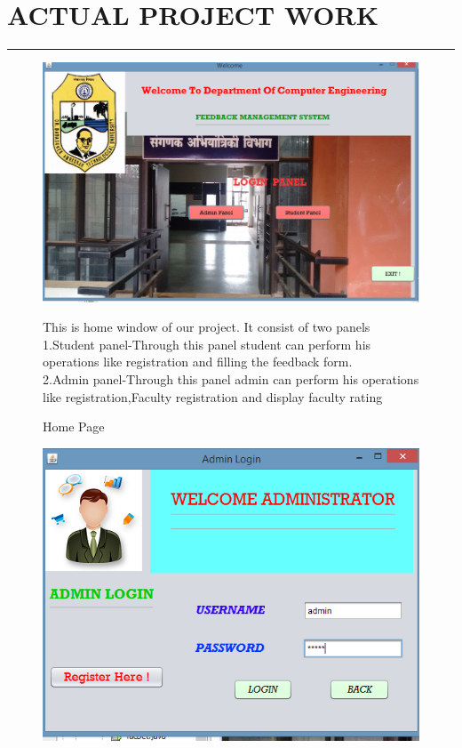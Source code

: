 \documentclass[12 pt,a4paper]{report}
\begin{document}
\chapter{ACTUAL PROJECT WORK}
\begin{center}
\rule{\textwidth}{2 pt}
\begin{figure}[ht]
\begin{center}
\includegraphics[scale=.5]{welcome.png}\\
\caption{Home Page}
\vspace{0.2 cm}
\justify
{This is home window of our project. It consist of two panels}\\
{1.Student panel-Through this panel student can perform his operations like registration and filling the feedback form. }\\
{2.Admin panel-Through this panel admin can perform his operations like registration,Faculty registration and display faculty rating}
\end{center}
\end{figure}
\begin{figure}[ht]
\begin{center}
\includegraphics[scale=.7]{adminlogin.png}\\

\end{center}
\end{figure}
\end{center}
\end{document}
